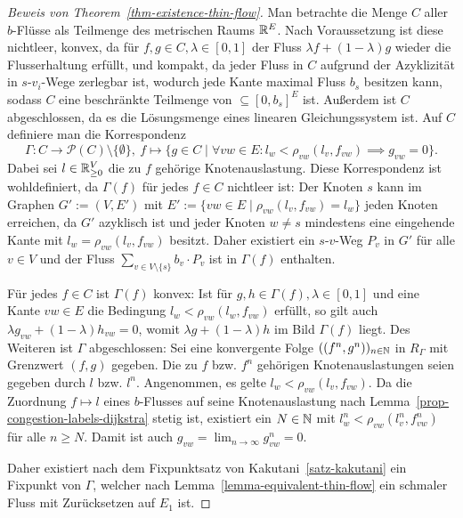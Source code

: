 \begin{proof}[Beweis von Theorem~\ref{thm-existence-thin-flow}]
	Man betrachte die Menge $C$ aller $b$-Flüsse als Teilmenge des metrischen Raums $\mathbb{R}^E$.
	Nach Voraussetzung ist diese nichtleer, konvex, da für $f, g\in C, \lambda \in [0,1]$ der Fluss $\lambda f + (1-\lambda)g$ wieder die Flusserhaltung erfüllt, und kompakt, da jeder Fluss in $C$ aufgrund der Azyklizität in $s$-$v_i$-Wege zerlegbar ist, wodurch jede Kante maximal Fluss $b_s$ besitzen kann, sodass $C$ eine beschränkte Teilmenge von $\subseteq [0, b_s]^E$ ist.
	Außerdem ist $C$ abgeschlossen, da es die Lösungsmenge eines linearen Gleichungssystem ist.
	Auf $C$ definiere man die Korrespondenz
	\[
	\Gamma: C\to \mathcal{P}(C)\setminus\{ \emptyset \}, ~ f\mapsto \{ g\in C \mid \forall vw\in E: l_w < \rho_{vw}(l_v, f_{vw}) \implies g_{vw} = 0 \}.
	\]
	Dabei sei $l\in\mathbb{R}_{\geq 0}^V$ die zu $f$ gehörige Knotenauslastung.
	Diese Korrespondenz ist wohldefiniert, da $\Gamma(f)$ für jedes $f\in C$ nichtleer ist:
	Der Knoten $s$ kann im Graphen $G':= (V, E')$ mit $E':= \{ vw\in E \mid \rho_{vw}(l_v, f_{vw})=l_w \}$ jeden Knoten erreichen, da $G'$ azyklisch ist und jeder Knoten $w\neq s$ mindestens eine eingehende Kante mit $l_w = \rho_{vw}(l_v, f_{vw})$ besitzt. 
	Daher existiert ein $s$-$v$-Weg $P_v$ in $G'$ für alle $v\in V$ und der Fluss $\sum_{v\in V\setminus\{ s\}} b_v \cdot P_v$ ist in $\Gamma(f)$ enthalten.
	
	Für jedes $f\in C$ ist $\Gamma(f)$ konvex: Ist für $g, h\in \Gamma(f), \lambda\in [0,1]$ und eine Kante $vw\in E$ die Bedingung $l_w < \rho_{vw}(l_w, f_{vw})$ erfüllt, so gilt auch $\lambda g_{vw} + (1-\lambda) h_{vw} = 0$, womit $\lambda g + (1-\lambda)h$ im Bild $\Gamma(f)$ liegt.
	Des Weiteren ist $\Gamma$ abgeschlossen: 
	Sei eine konvergente Folge $((f^{n}, g^{n}))_{n\in\mathbb{N}}$ in $R_\Gamma$ mit Grenzwert $(f, g)$ gegeben.
	Die zu $f$ bzw. $f^n$ gehörigen Knotenauslastungen seien gegeben durch $l$ bzw. $l^n$.
	Angenommen, es gelte $l_w < \rho_{vw}(l_v, f_{vw})$.
	Da die Zuordnung $f\mapsto l$ eines $b$-Flusses auf seine Knotenauslastung nach Lemma~\ref{prop-congestion-labels-dijkstra} stetig ist, existiert ein $N\in\mathbb{N}$ mit $l_w^n<\rho_{vw}(l_v^n, f_{vw}^n)$ für alle $n\geq N$.
	Damit ist auch $g_{vw} = \lim_{n\to\infty} g_{vw}^n = 0$.
	
	Daher existiert nach dem Fixpunktsatz von Kakutani~\ref{satz-kakutani} ein Fixpunkt von $\Gamma$, welcher nach Lemma~\ref{lemma-equivalent-thin-flow} ein schmaler Fluss mit Zurücksetzen auf $E_1$ ist.
\end{proof}

